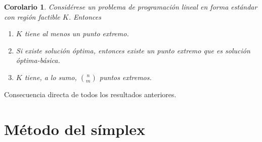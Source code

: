 \documentclass[11pt]{report}
\makeatletter
\renewenvironment{proof}[1][\proofname]{\par
  \pushQED{\qed}%
  \normalfont \topsep\z@skip %
  \trivlist
  \item[\hskip\labelsep
        \itshape
    #1\@addpunct{.}]\ignorespaces
}{%
  \popQED\endtrivlist\@endpefalse
}
\theoremstyle{mytheorem}
\newtheorem{corollary}{Corolario} %
\theoremstyle{mydefinition}
\theoremstyle{myexample}
\let\oldproofname=\proofname
\renewcommand{\proofname}{\rm\bf{\oldproofname}}}
\newenvironment{ccorollary} %
  {\begin{mdframed}[
        linewidth=3pt,
        linecolor=c2,
        bottomline=false,
        topline=false,
        rightline=false,
        innerrightmargin=0pt,
        innertopmargin=0pt,
        innerbottommargin=0pt,
        innerleftmargin=1em,
        skipabove=\baselineskip]
    \begin{corollary}}
  {\end{corollary}\end{mdframed}}
\makeatother
\begin{document}
\begin{ccorollary}
Considérese un problema de programación lineal en forma estándar con región factible $K$. Entonces
\begin{enumerate}
    \item $K$ tiene al menos un punto extremo.
    \item Si existe solución óptima, entonces existe un punto extremo que es solución óptima-básica.
    \item $K$ tiene, a lo sumo, $\binom{n}{m}$ puntos extremos.
\end{enumerate}
\end{ccorollary}

\begin{proof}
Consecuencia directa de todos los resultados anteriores.
\end{proof}

\chapter{Método del símplex}
\end{document}
